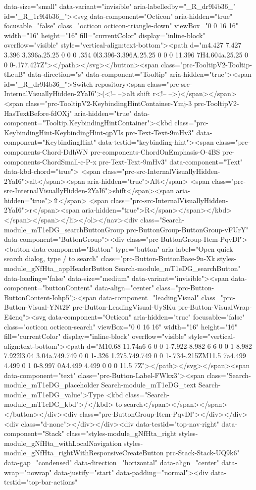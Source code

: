 data-size="small" data-variant="invisible" aria-labelledby="_R_dr9l4b36_" id="_R_1r9l4b36_"><svg data-component="Octicon" aria-hidden="true" focusable="false" class="octicon octicon-triangle-down" viewBox="0 0 16 16" width="16" height="16" fill="currentColor" display="inline-block" overflow="visible" style="vertical-align:text-bottom"><path d="m4.427 7.427 3.396 3.396a.25.25 0 0 0 .354 0l3.396-3.396A.25.25 0 0 0 11.396 7H4.604a.25.25 0 0 0-.177.427Z"></path></svg></button><span class="prc-TooltipV2-Tooltip-tLeuB" data-direction="s" data-component="Tooltip" aria-hidden="true"><span id="_R_dr9l4b36_">Switch repository<span class="prc-src-InternalVisuallyHidden-2YaI6">(<!-- -->alt shift r<!-- -->)</span></span><span class="prc-TooltipV2-KeybindingHintContainer-Ymj-3 prc-TooltipV2-HasTextBefore-fdOXj" aria-hidden="true" data-component="Tooltip.KeybindingHintContainer"><kbd class="prc-KeybindingHint-KeybindingHint-qpYIs prc-Text-Text-9mHv3" data-component="KeybindingHint" data-testid="keybinding-hint"><span class="prc-components-Chord-DdhWN prc-components-ChordOnEmphasis-O-4BS prc-components-ChordSmall-c-P-x prc-Text-Text-9mHv3" data-component="Text" data-kbd-chord="true"> <span class="prc-src-InternalVisuallyHidden-2YaI6">alt</span><span aria-hidden="true">Alt</span> <span class="prc-src-InternalVisuallyHidden-2YaI6">shift</span><span aria-hidden="true">⇧</span> <span class="prc-src-InternalVisuallyHidden-2YaI6">r</span><span aria-hidden="true">R</span></span></kbd></span></span></li></ol></nav><div class="Search-module_mT1eDG_searchButtonGroup prc-ButtonGroup-ButtonGroup-vFUrY" data-component="ButtonGroup"><div class="prc-ButtonGroup-Item-PqvDl"><button data-component="Button" type="button" aria-label="Open quick search dialog, type / to search" class="prc-Button-ButtonBase-9n-Xk styles-module_gNfHta_appHeaderButton Search-module_mT1eDG_searchButton" data-loading="false" data-size="medium" data-variant="invisible"><span data-component="buttonContent" data-align="center" class="prc-Button-ButtonContent-Iohp5"><span data-component="leadingVisual" class="prc-Button-Visual-YNt2F prc-Button-LeadingVisual-UySKu prc-Button-VisualWrap-E4cnq"><svg data-component="Octicon" aria-hidden="true" focusable="false" class="octicon octicon-search" viewBox="0 0 16 16" width="16" height="16" fill="currentColor" display="inline-block" overflow="visible" style="vertical-align:text-bottom"><path d="M10.68 11.74a6 6 0 0 1-7.922-8.982 6 6 0 0 1 8.982 7.922l3.04 3.04a.749.749 0 0 1-.326 1.275.749.749 0 0 1-.734-.215ZM11.5 7a4.499 4.499 0 1 0-8.997 0A4.499 4.499 0 0 0 11.5 7Z"></path></svg></span><span data-component="text" class="prc-Button-Label-FWkx3"><span class="Search-module_mT1eDG_placeholder Search-module_mT1eDG_text Search-module_mT1eDG_value">Type <kbd class="Search-module_mT1eDG_kbd">/</kbd> to search</span></span></span></button></div><div class="prc-ButtonGroup-Item-PqvDl"></div></div><div class="d-none"></div></div><div data-testid="top-nav-right" data-component="Stack" class="styles-module_gNfHta_right styles-module_gNfHta_withLocalNavigation styles-module_gNfHta_rightWithResponsiveCreateButton prc-Stack-Stack-UQ9k6" data-gap="condensed" data-direction="horizontal" data-align="center" data-wrap="nowrap" data-justify="start" data-padding="normal"><div data-testid="top-bar-actions" 